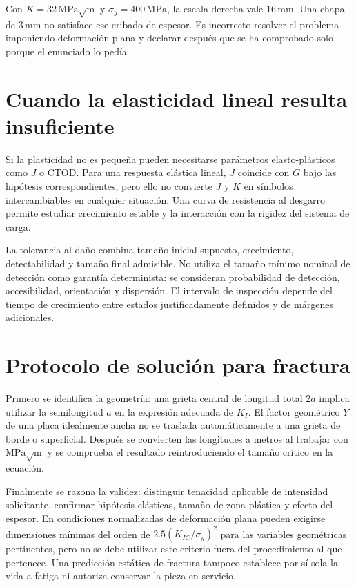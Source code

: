 Con $K=32\,\mathrm{MPa\sqrt m}$ y $\sigma_y=400\,\mathrm{MPa}$, la escala derecha vale $16\,\mathrm{mm}$. Una chapa de $3\,\mathrm{mm}$ no satisface ese cribado de espesor. Es incorrecto resolver el problema imponiendo deformación plana y declarar después que se ha comprobado solo porque el enunciado lo pedía.
\section{Cuando la elasticidad lineal resulta insuficiente}
Si la plasticidad no es pequeña pueden necesitarse parámetros elasto-plásticos como $J$ o CTOD. Para una respuesta elástica lineal, $J$ coincide con $G$ bajo las hipótesis correspondientes, pero ello no convierte $J$ y $K$ en símbolos intercambiables en cualquier situación. Una curva de resistencia al desgarro permite estudiar crecimiento estable y la interacción con la rigidez del sistema de carga.

La tolerancia al daño combina tamaño inicial supuesto, crecimiento, detectabilidad y tamaño final admisible. No utiliza el tamaño mínimo nominal de detección como garantía determinista: se consideran probabilidad de detección, accesibilidad, orientación y dispersión. El intervalo de inspección depende del tiempo de crecimiento entre estados justificadamente definidos y de márgenes adicionales.
\section{Protocolo de solución para fractura}
Primero se identifica la geometría: una grieta central de longitud total $2a$ implica utilizar la semilongitud $a$ en la expresión adecuada de $K_I$. El factor geométrico $Y$ de una placa idealmente ancha no se traslada automáticamente a una grieta de borde o superficial. Después se convierten las longitudes a metros al trabajar con $\mathrm{MPa\sqrt m}$ y se comprueba el resultado reintroduciendo el tamaño crítico en la ecuación.

Finalmente se razona la validez: distinguir tenacidad aplicable de intensidad solicitante, confirmar hipótesis elásticas, tamaño de zona plástica y efecto del espesor. En condiciones normalizadas de deformación plana pueden exigirse dimensiones mínimas del orden de $2.5(K_{IC}/\sigma_y)^2$ para las variables geométricas pertinentes, pero no se debe utilizar este criterio fuera del procedimiento al que pertenece. Una predicción estática de fractura tampoco establece por sí sola la vida a fatiga ni autoriza conservar la pieza en servicio.

